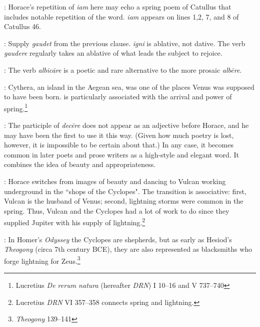 
: Horace's repetition of \textit{iam} here may echo a spring poem of Catullus that includes notable repetition of the word.  \textit{iam} appears on lines 1,2, 7, and 8 of Catullus 46.


: Supply \textit{gaudet} from the previous clause.  \textit{igni} is ablative, not dative.  The verb \textit{gaudere} regularly takes an ablative of what leads the subject to rejoice.


: The verb \textit{albicāre} is a poetic and rare alternative to the more prosaic \textit{albēre}.


: Cythera, an island in the Aegean sea, was one of the places Venus was supposed to have been born.\indent{} is particularly associated with the arrival and power of spring.\footnote{Lucretius \textit{De rerum natura} (hereafter \textit{DRN}) I 10--16 and V 737--740}


: The participle of \textit{decēre} does not appear as an adjective before Horace, and he may have been the first to use it this way.  (Given how much poetry is lost, however, it is impossible to be certain about that.)  In any case, it becomes common in later poets and prose writers as a high-style and elegant word. It combines the idea of beauty and appropriateness.


: Horace switches from images of beauty and dancing to Vulcan working underground in the ``shops of the Cyclopes".  The transition is associative: first, Vulcan is the husband of Venus; second, lightning storms were common in the spring.  Thus, Vulcan and the Cyclopes had a lot of work to do since they supplied Jupiter with his supply of lightning.\footnote{Lucretius \textit{DRN} VI 357--358 connects spring and lightning.}


: In Homer's \textit{Odyssey} the Cyclopes are shepherds, but as early as Hesiod's \textit{Theogony} (circa 7th century BCE), they are also represented as blacksmiths who forge lightning for Zeus.\footnote{\textit{Theogony} 139--141}


